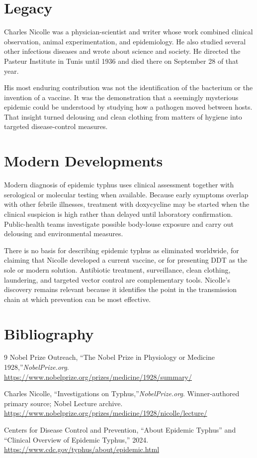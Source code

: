 \section{Legacy}

Charles Nicolle was a physician-scientist and writer whose work combined clinical observation, animal experimentation, and epidemiology. He also studied several other infectious diseases and wrote about science and society. He directed the Pasteur Institute in Tunis until 1936 and died there on September 28 of that year.

His most enduring contribution was not the identification of the bacterium or the invention of a vaccine. It was the demonstration that a seemingly mysterious epidemic could be understood by studying how a pathogen moved between hosts. That insight turned delousing and clean clothing from matters of hygiene into targeted disease-control measures.

\section{Modern Developments}

Modern diagnosis of epidemic typhus uses clinical assessment together with serological or molecular testing when available. Because early symptoms overlap with other febrile illnesses, treatment with doxycycline may be started when the clinical suspicion is high rather than delayed until laboratory confirmation. Public-health teams investigate possible body-louse exposure and carry out delousing and environmental measures.

There is no basis for describing epidemic typhus as eliminated worldwide, for claiming that Nicolle developed a current vaccine, or for presenting DDT as the sole or modern solution. Antibiotic treatment, surveillance, clean clothing, laundering, and targeted vector control are complementary tools. Nicolle's discovery remains relevant because it identifies the point in the transmission chain at which prevention can be most effective.

\section{Bibliography}

\begin{thebibliography}{9}
Nobel Prize Outreach, ``The Nobel Prize in Physiology or Medicine 1928,''\emph{NobelPrize.org}.\newline
\url{https://www.nobelprize.org/prizes/medicine/1928/summary/}

Charles Nicolle, ``Investigations on Typhus,''\emph{NobelPrize.org}. Winner-authored primary source; Nobel Lecture archive.\newline
\url{https://www.nobelprize.org/prizes/medicine/1928/nicolle/lecture/}

Centers for Disease Control and Prevention, ``About Epidemic Typhus'' and ``Clinical Overview of Epidemic Typhus,'' 2024.\newline
\url{https://www.cdc.gov/typhus/about/epidemic.html}
\end{thebibliography}
